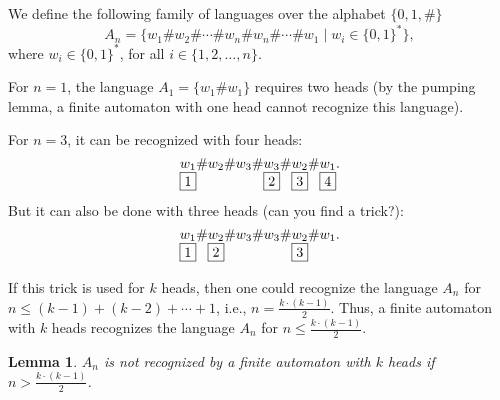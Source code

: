 \documentclass[12pt,sans]{article}
\newcommand{\bits}{\{0,1\}}
\newcommand{\bitstr}{\bits^*}
\theoremstyle{definition}
\theoremstyle{plain}
\newtheorem{lemma}{Lemma}[section]
\theoremstyle{remark}
\begin{document}
We define the following family of languages over the alphabet $\{0,1,\#\}$
\[
A_n = \{w_1\#w_2\#\dotsb\#w_n\#w_n\#\dotsb\#w_1 \mid w_i \in \bitstr\},
\]
where $w_i \in \bitstr$, for all $i \in \{1,2,\dotsc,n\}$.

For $n = 1$, the language $A_1 = \{w_1\#w_1\}$ requires two heads (by the pumping lemma, a finite automaton with one head cannot recognize this language).

For $n = 3$, it can be recognized with four heads:
\[
\underset{\fbox{1}}{w_1}\#w_2\#w_3\#\underset{\fbox{2}}{w_3}\#\underset{\fbox{3}}{w_2}\#\underset{\fbox{4}}{w_1}.
\]
But it can also be done with three heads (can you find a trick?):
\[
\underset{\fbox{1}}{w_1}\#\underset{\fbox{2}}{w_2}\#w_3\#w_3\#\underset{\fbox{3}}{w_2}\#w_1.
\]

If this trick is used for $k$ heads, then one could recognize the language $A_n$ for $n \le (k-1) + (k-2) + \dotsb + 1$, i.e., $n = \frac{k \cdot (k-1)}{2}$. Thus, a finite automaton with $k$ heads recognizes the language $A_n$ for $n \le \frac{k \cdot (k-1)}{2}$.

\begin{lemma}
    $A_n$ is not recognized by a finite automaton with $k$ heads if $n > \frac{k \cdot (k-1)}{2}$.
\end{lemma}
\end{document}
